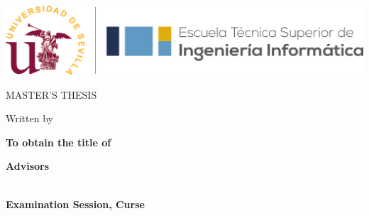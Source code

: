 \thispagestyle{empty} %
\begin{center}

\vspace*{1cm}

\includegraphics[width=\textwidth]{figures/etsii_us.png}

\vspace*{3cm}
\begin{large}
MASTER'S THESIS
\end{large}

\vspace*{0.1in}
\textbf{\huge \tfgTitle}

\vspace*{.2in}

{\large Written by}\\
\textbf{\Large \tfgAuthors}

\vspace*{3cm}

\textbf{To obtain the title of}\\
{\large \tfgDegree}

\vspace*{0.2in}

\textbf{Advisors}\\
{\large \tfgSupervisor}\\

\vspace*{0.2in}


\vspace*{.6in}
\textbf{\Large \tfgMonth  Examination Session, Curse \tfgYear}

\end{center}

\ifdefined\tfgDedication
    \newpage
    \thispagestyle{empty}
    
    \vspace*{\fill}
    \begin{center}
    \textit{\tfgDedication}
    \end{center}
    \vspace*{\fill}
\fi

\clearpage\setcounter{page}{1} %
